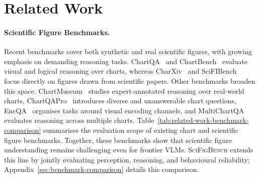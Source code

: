 \section{Related Work}
\label{sec:related_work}

\paragraph{Scientific Figure Benchmarks.}
Recent benchmarks cover both synthetic and real scientific figures, with growing emphasis on demanding reasoning tasks. ChartQA~\citep{masry2022chartqa} and ChartBench~\citep{xu2024chartbench} evaluate visual and logical reasoning over charts, whereas CharXiv~\citep{wang2024charxiv} and SciFIBench~\citep{roberts2024scifibench} focus directly on figures drawn from scientific papers. Other benchmarks broaden this space. ChartMuseum~\citep{tang2025chartmuseum} studies expert-annotated reasoning over real-world charts, ChartQAPro~\citep{masry2025chartqapro} introduces diverse and unanswerable chart questions, EncQA~\citep{mukherjee2025encqa} organises tasks around visual encoding channels, and MultiChartQA~\citep{zhu2024multichartqa} evaluates reasoning across multiple charts. Table~\ref{tab:related-work-benchmark-comparison} summarises the evaluation scope of existing chart and scientific figure benchmarks. Together, these benchmarks show that scientific figure understanding remains challenging even for frontier VLMs.
\textsc{SciFigBench} extends this line by jointly evaluating perception, reasoning, and behavioural reliability; Appendix~\ref{sec:benchmark-comparison} details this comparison.




